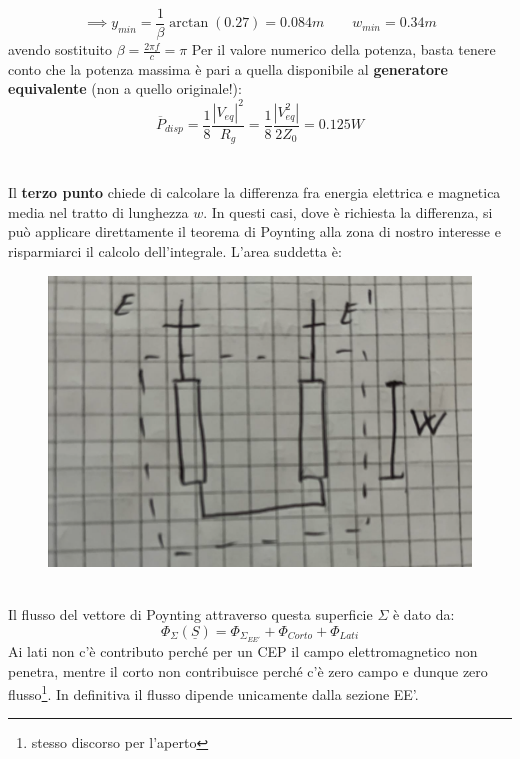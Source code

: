 \documentclass{book}
\begin{document}
        \begin{equation}
            \implies y_{min} = \frac{1}{\beta}\arctan(0.27) = 0.084m \qquad w_{min}=0.34m
        \end{equation}
        avendo sostituito $\beta = \displaystyle \frac{2\pi f}{c} = \pi$
        Per il valore numerico della potenza, basta tenere conto che la potenza massima è pari a quella disponibile al \textbf{generatore equivalente} (non a quello originale!):
        \begin{equation}
            \overline{P}_{disp}=\frac{1}{8}\frac{|V_{eq}| ^{2}}{R_{g}} = \frac{1}{8}\frac{|V_{eq} ^{2}|}{2Z_{0}} = 0.125W
        \end{equation}
        \\ \\
        Il \textbf{terzo punto} chiede di calcolare la differenza fra energia elettrica e magnetica media nel tratto di lunghezza $w$.
        In questi casi, dove è richiesta la differenza, si può applicare direttamente il teorema di Poynting alla zona di nostro interesse e risparmiarci
        il calcolo dell'integrale. L'area suddetta è:
        \begin{figure}[h!]
            \center  
            \includegraphics[width=0.7\linewidth]{img/Esercizi/Esercizi3.png}
        \end{figure} \\
        Il flusso del vettore di Poynting attraverso questa superficie $\Sigma$ è dato da:
        \begin{equation}
            \Phi_{\Sigma}(\underline{S}) = \Phi_{\Sigma_{EE'}}+\Phi_{Corto}+\Phi_{Lati}
        \end{equation}
        Ai lati non c'è contributo perché per un CEP il campo elettromagnetico non penetra, mentre il corto non contribuisce
        perché c'è zero campo e dunque zero flusso\footnote{stesso discorso per l'aperto}. In definitiva il flusso dipende unicamente dalla sezione EE'.
\end{document}
